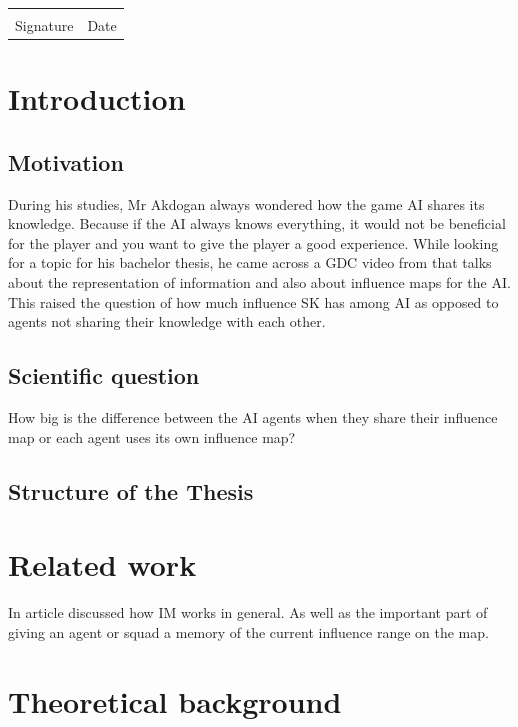 \documentclass[]{report}
\begin{document}
	\vfill
	\noindent\begin{tabular}{ll}
		\makebox[2.5in]{\hrulefill} & \makebox[2.5in]{\hrulefill}\\
		Signature & Date\\[8ex]
	\end{tabular}
	\newpage
	
	\newpage
	\tableofcontents

	\chapter{Introduction}
	
	\section{Motivation}
During his studies, Mr Akdogan always wondered how the game AI shares its knowledge. Because if the \ac{AI} always knows everything, it would not be beneficial for the player and you want to give the player a good experience. While looking for a topic for his bachelor thesis, he came across a \ac{GDC} video from \citep{knowledgeReprentation} that talks about the representation of information and also about influence maps for the \ac{AI}. This raised the question of how much influence \ac{SK} has among \ac{AI} as opposed to agents not sharing their knowledge with each other.
	
	\section{Scientific question}
	How big is the difference between the \ac{AI} agents when they share their influence map or each agent uses its own influence map? 
	\section{Structure of the Thesis}
	
	\chapter{Related work}
	In \citep{gameDevInfluenceMap} article discussed how \ac{IM} works in general. As well as the important part of giving an agent or squad a memory of the current influence range on the map. 
	
	\chapter{Theoretical background}
\end{document}
